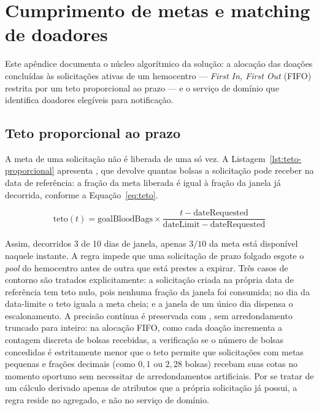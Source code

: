 \chapter{Cumprimento de metas e matching de doadores}
\label{ap:fulfillment}

Este apêndice documenta o núcleo algorítmico da solução: a alocação das doações concluídas às solicitações ativas de um hemocentro --- \textit{First In, First Out} (FIFO) restrita por um teto proporcional ao prazo --- e o serviço de domínio que identifica doadores elegíveis para notificação.

\section{Teto proporcional ao prazo}

A meta de uma solicitação não é liberada de uma só vez. A Listagem~\ref{lst:teto-proporcional} apresenta , que devolve quantas bolsas a solicitação pode receber na data de referência: a fração da meta liberada é igual à fração da janela  já decorrida, conforme a Equação~\ref{eq:teto}.

\begin{equation}
  \label{eq:teto}
  \mathrm{teto}(t) = \mathrm{goalBloodBags} \times \frac{t - \mathrm{dateRequested}}{\mathrm{dateLimit} - \mathrm{dateRequested}}
\end{equation}

Assim, decorridos 3 de 10 dias de janela, apenas $3/10$ da meta está disponível naquele instante. A regra impede que uma solicitação de prazo folgado esgote o \textit{pool} do hemocentro antes de outra que está prestes a expirar. Três casos de contorno são tratados explicitamente: a solicitação criada na própria data de referência tem teto nulo, pois nenhuma fração da janela foi consumida; no dia da data-limite o teto iguala a meta cheia; e a janela de um único dia dispensa o escalonamento. A precisão contínua é preservada com , sem arredondamento truncado para inteiro: na alocação FIFO, como cada doação incrementa a contagem discreta de bolsas recebidas, a verificação se o número de bolsas concedidas é estritamente menor que o teto permite que solicitações com metas pequenas e frações decimais (como $0{,}1$ ou $2{,}28$ bolsas) recebam suas cotas no momento oportuno sem necessitar de arredondamentos artificiais. Por se tratar de um cálculo derivado apenas de atributos que a própria solicitação já possui, a regra reside no agregado, e não no serviço de domínio.


